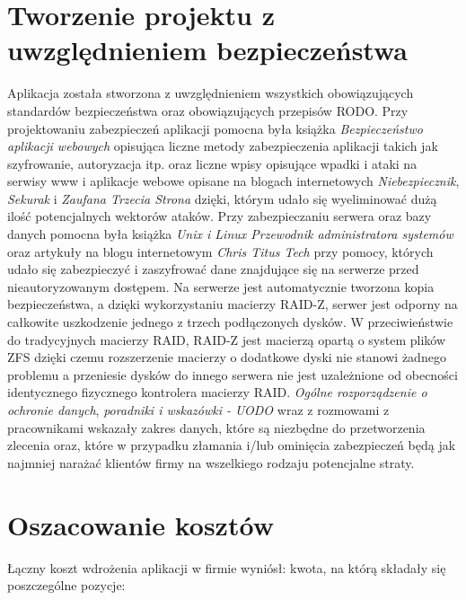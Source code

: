 \documentclass[12pt,a4paper]{article}
\begin{document}
	\section{Tworzenie projektu z uwzględnieniem bezpieczeństwa}
		\indent Aplikacja została stworzona z uwzględnieniem wszystkich obowiązujących standardów bezpieczeństwa oraz obowiązujących przepisów RODO.
		Przy projektowaniu zabezpieczeń aplikacji pomocna była książka \emph{Bezpieczeństwo aplikacji webowych}\cite{BAW} opisująca liczne metody zabezpieczenia aplikacji
		takich jak szyfrowanie, autoryzacja itp. oraz liczne wpisy opisujące wpadki i ataki na serwisy www i aplikacje webowe opisane na blogach internetowych
		\emph{Niebezpiecznik}\cite{Nieb}, \emph{Sekurak}\cite{Sek} i \emph{Zaufana Trzecia Strona}\cite{ZTS} dzięki, którym udało się wyeliminować dużą ilość potencjalnych wektorów ataków. 
		Przy zabezpieczaniu serwera oraz bazy danych pomocna była książka \emph{Unix i Linux Przewodnik administratora systemów}\cite{Unix} oraz artykuły na blogu internetowym
		\emph{Chris Titus Tech}\cite{CTT} przy pomocy, których udało się zabezpieczyć i zaszyfrować dane znajdujące się na serwerze przed nieautoryzowanym dostępem. Na serwerze
		jest automatycznie tworzona kopia bezpieczeństwa, a dzięki wykorzystaniu macierzy RAID-Z, serwer jest odporny na całkowite uszkodzenie jednego z trzech podłączonych dysków.
		W przeciwieństwie do tradycyjnych macierzy RAID, RAID-Z jest macierzą opartą o system plików ZFS dzięki czemu rozszerzenie macierzy o dodatkowe dyski nie stanowi żadnego problemu
		a przeniesie dysków do innego serwera nie jest uzależnione od obecności identycznego fizycznego kontrolera macierzy RAID.
		\emph{Ogólne rozporządzenie o ochronie danych}\cite{RODO}, \emph{poradniki i wskazówki - UODO}\cite{UODO} wraz z rozmowami z pracownikami wskazały
		zakres danych, które są niezbędne do przetworzenia zlecenia oraz, które w przypadku złamania i/lub ominięcia zabezpieczeń będą jak najmniej
		narażać klientów firmy na wszelkiego rodzaju potencjalne straty.  
	\newpage
	
	\section{Oszacowanie kosztów}
		\indent Łączny koszt wdrożenia aplikacji w firmie wyniósł: kwota, na którą składały się poszczególne pozycje:
\end{document}
